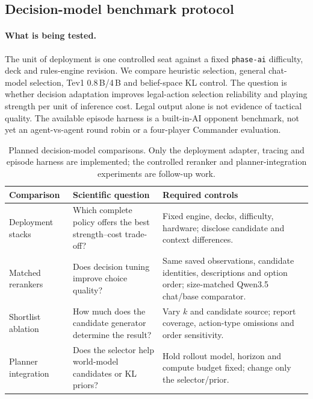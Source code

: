 \documentclass[11pt,a4paper]{article}
\theoremstyle{definition}
\theoremstyle{plain}
\begin{document}
\subsection{Decision-model benchmark protocol}
\label{sec:decision-benchmark}

\paragraph{What is being tested.}
The unit of deployment is one controlled seat against a fixed
\texttt{phase-ai} difficulty, deck and rules-engine revision. We compare
heuristic selection, general chat-model selection, Tev1 0.8\,B/4\,B and
belief-space KL control. The question is whether decision adaptation
improves legal-action selection reliability and playing strength per unit
of inference cost. Legal output alone is not evidence of tactical quality.
The available episode harness is a built-in-AI opponent benchmark, not
yet an agent-vs-agent round robin or a four-player Commander evaluation.

\begin{table}[ht]
\centering
\small
\begin{tabularx}{\linewidth}{lXX}
\toprule
Comparison & Scientific question & Required controls \\
\midrule
Deployment stacks & Which complete policy offers the best strength--cost trade-off? &
Fixed engine, decks, difficulty, hardware; disclose candidate and context differences. \\
Matched rerankers & Does decision tuning improve choice quality? &
Same saved observations, candidate identities, descriptions and option order; size-matched Qwen3.5 chat/base comparator. \\
Shortlist ablation & How much does the candidate generator determine the result? &
Vary $k$ and candidate source; report coverage, action-type omissions and order sensitivity. \\
Planner integration & Does the selector help world-model candidates or KL priors? &
Hold rollout model, horizon and compute budget fixed; change only the selector/prior. \\
\bottomrule
\end{tabularx}
\caption{Planned decision-model comparisons. Only the deployment adapter,
tracing and episode harness are implemented; the controlled reranker and
planner-integration experiments are follow-up work.}
\label{tab:decision-benchmark}
\end{table}
\end{document}
